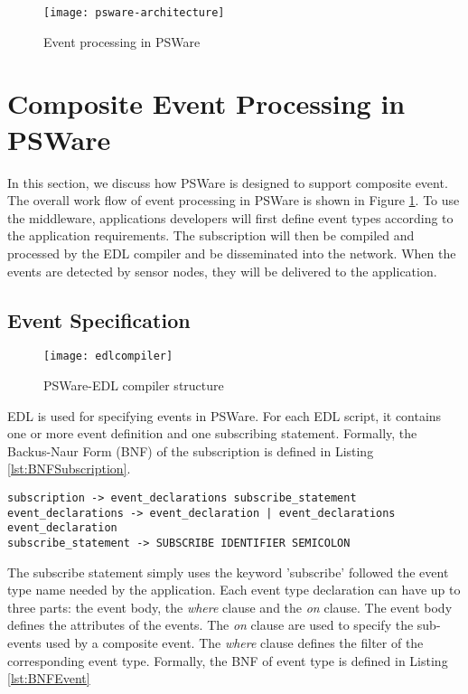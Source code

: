 \begin{figure}
\centering
\texttt{[image: psware-architecture]}
\caption{Event processing in PSWare}
\label{fig:psware-architecture}
\end{figure}

\section{Composite Event Processing in PSWare}
\label{sec:design}
In this section, we discuss how PSWare is designed to support composite event. The overall work flow of event processing in PSWare is shown in Figure \ref{fig:psware-architecture}. To use the middleware, applications developers will first define event types according to the application requirements. The subscription will then be compiled and processed by the EDL compiler and be disseminated into the network. When the events are detected by sensor nodes, they will be delivered to the application.

\subsection{Event Specification}
\begin{figure}
\centering
\texttt{[image: edlcompiler]}
\caption{PSWare-EDL compiler structure}
\label{fig:edlcompiler}
\end{figure}

EDL is used for specifying events in PSWare. For each EDL script, it contains one or more event definition and one subscribing statement. Formally, the Backus-Naur Form (BNF) of the subscription is defined in Listing \ref{lst:BNFSubscription}.

\begin{lstlisting}[caption=BNF (simplified) of subscription, label=lst:BNFSubscription]
subscription -> event_declarations subscribe_statement
event_declarations -> event_declaration | event_declarations event_declaration
subscribe_statement -> SUBSCRIBE IDENTIFIER SEMICOLON
\end{lstlisting}

The subscribe statement simply uses the keyword 'subscribe' followed the event type name needed by the application. Each event type declaration can have up to three parts: the event body, the \emph{where} clause and the \emph{on} clause. The event body defines the attributes of the events. The \emph{on} clause are used to specify the sub-events used by a composite event. The \emph{where} clause defines the filter of the corresponding event type. Formally, the BNF of event type is defined in Listing \ref{lst:BNFEvent}

